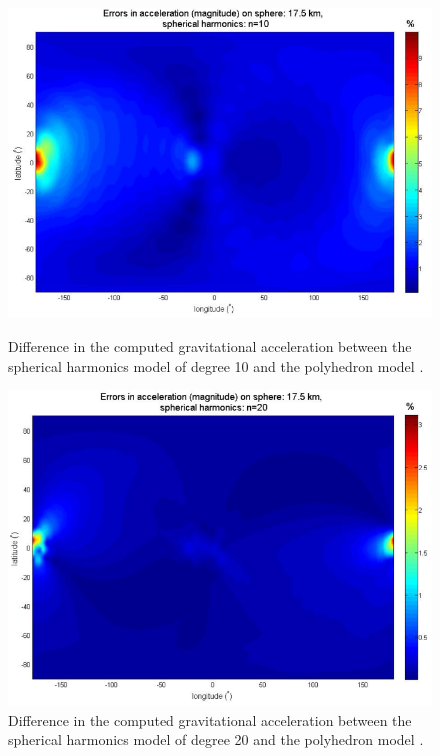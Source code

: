 \begin{figure}[h]
\begin{minipage}[t]{0.5\textwidth}
\centering
\includegraphics[width=\textwidth]{spherical_10_comparison.png}
\caption{Difference in the computed gravitational acceleration between the spherical harmonics model of degree 10 and the polyhedron model \cite{spherical_ellipsoidal_comparison}.}
\label{fig:spherical_10_comparison}
\end{minipage}
\hspace{0.5cm}
\begin{minipage}[t]{0.5\textwidth}
\centering
\includegraphics[width=\textwidth]{spherical_20_comparison.png}
\caption{Difference in the computed gravitational acceleration between the spherical harmonics model of degree 20 and the polyhedron model \cite{spherical_ellipsoidal_comparison}.}
\label{fig:spherical_20_comparison}
\end{minipage}
\end{figure}

